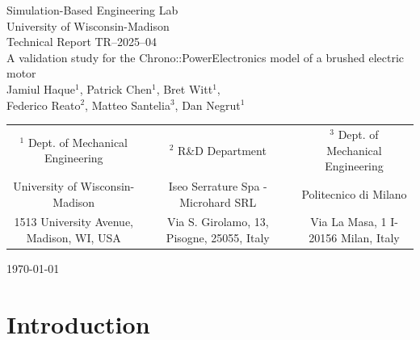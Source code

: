 \documentclass[11pt]{article}
\begin{document}

	
\begin{titlepage}
	\begin{center}
		Simulation-Based Engineering Lab \\
		University of Wisconsin-Madison \\
		\LARGE Technical Report TR--2025--04\\
		\vfill 
		\LARGE A validation study for the Chrono::PowerElectronics model of a brushed electric motor\\
		\vspace{0.5in}
		\Large Jamiul Haque$^1$, Patrick Chen$^1$, Bret Witt$^1$, \\
		Federico Reato$^2$, Matteo Santelia$^3$, Dan Negrut$^1$\\
		\vspace{0.2in}
		
		{
			\footnotesize
			\begin{minipage}{\textwidth} %
				\hspace{-2cm} %
				\begin{tabular}{ccccc}
					$^1$ Dept. of Mechanical Engineering & \hspace{0.0cm}   & $^2$ R\&D Department & \hspace{0.0cm}   & $^3$ Dept. of Mechanical Engineering       \\
					University of Wisconsin-Madison & \hspace{0.0cm}&  Iseo Serrature Spa - Microhard SRL& \hspace{0.0cm} & Politecnico di Milano \\
					1513 University Avenue, Madison, WI, USA & \hspace{0.0cm}& Via S. Girolamo, 13, Pisogne, 25055, Italy& \hspace{0.0cm} & Via La Masa, 1 I-20156 Milan, Italy \\
				\end{tabular}
			\end{minipage}
		}
		
		\vfill		
		\today		
	\end{center}
\end{titlepage}


\tableofcontents

\newpage

\section{Introduction}
\label{sec:intro}

\end{document}
